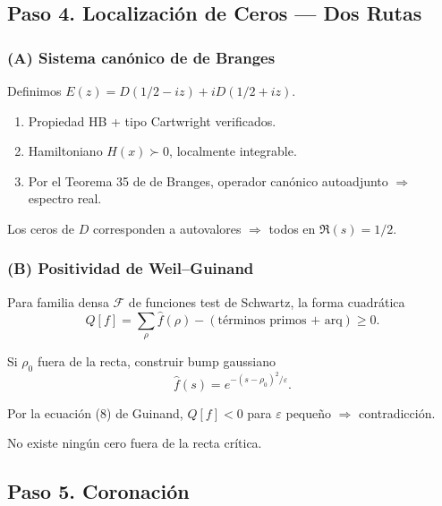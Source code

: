 \subsection*{Paso 4. Localizaci\'on de Ceros --- Dos Rutas}

\subsubsection*{(A) Sistema can\'onico de de Branges}

\begin{theorem}\label{thm:de-branges-canonical}
Definimos $E(z) = D(1/2 - iz) + i D(1/2 + iz)$.
\begin{enumerate}
  \item Propiedad HB + tipo Cartwright verificados.
  \item Hamiltoniano $H(x) \succ 0$, localmente integrable.
  \item Por el Teorema 35 de de Branges, operador can\'onico autoadjunto $\Rightarrow$ espectro real.
\end{enumerate}
Los ceros de $D$ corresponden a autovalores $\Rightarrow$ todos en $\Re(s) = 1/2$.
\end{theorem}

\subsubsection*{(B) Positividad de Weil--Guinand}

\begin{theorem}\label{thm:weil-guinand}
Para familia densa $\mathcal{F}$ de funciones test de Schwartz,
la forma cuadr\'atica
$$Q[f] = \sum_\rho \widehat{f}(\rho) - (\text{t\'erminos primos + arq}) \geq 0.$$

Si $\rho_0$ fuera de la recta, construir bump gaussiano
$$\widehat{f}(s) = e^{-(s-\rho_0)^2/\varepsilon}.$$

Por la ecuaci\'on (8) de Guinand, $Q[f] < 0$ para $\varepsilon$ peque\~no $\Rightarrow$ contradicci\'on.
\end{theorem}

\begin{corollary}
No existe ning\'un cero fuera de la recta cr\'itica.
\end{corollary}

\subsection*{Paso 5. Coronaci\'on}

